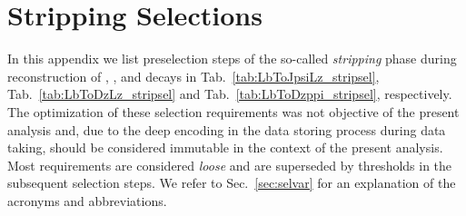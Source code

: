 \chapter{Stripping Selections}
In this appendix we list preselection steps of the so-called \textit{\gls{stripping}} phase during reconstruction of \decay{\Lb}{\jpsi\Lz}, \decay{\Lb}{\Dz\Lz}, and \decay{\Lb}{\Dz\proton\pim} decays in Tab.~\ref{tab:LbToJpsiLz_stripsel}, Tab.~\ref{tab:LbToDzLz_stripsel} and Tab.~\ref{tab:LbToDzppi_stripsel}, respectively.
The optimization of these selection requirements was not objective of the present analysis and, due to the deep encoding in the data storing process during data taking, should be considered immutable in the context of the present analysis.
Most requirements are considered \textit{loose} and are superseded by thresholds in the subsequent selection steps.
We refer to Sec.~\ref{sec:selvar} for an explanation of the acronyms and abbreviations.

